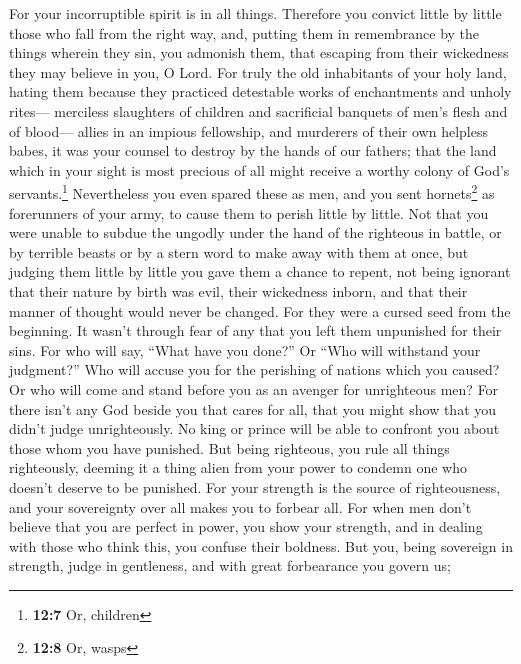  For your incorruptible spirit is in all things.
 Therefore you convict little by little those who fall
from the right way, and, putting them in remembrance by the things
wherein they sin, you admonish them, that escaping from their wickedness
they may believe in you, O Lord.  For truly the old
inhabitants of your holy land,  hating them because they
practiced detestable works of enchantments and unholy rites---
 merciless slaughters of children and sacrificial banquets
of men's flesh and of blood---  allies in an impious
fellowship, and murderers of their own helpless babes, it was your
counsel to destroy by the hands of our fathers;  that the
land which in your sight is most precious of all might receive a worthy
colony of God's servants.\footnote{\textbf{12:7} Or, children}
 Nevertheless you even spared these as men, and you sent
hornets\footnote{\textbf{12:8} Or, wasps} as forerunners of your army,
to cause them to perish little by little.  Not that you
were unable to subdue the ungodly under the hand of the righteous in
battle, or by terrible beasts or by a stern word to make away with them
at once,  but judging them little by little you gave them
a chance to repent, not being ignorant that their nature by birth was
evil, their wickedness inborn, and that their manner of thought would
never be changed.  For they were a cursed seed from the
beginning. It wasn't through fear of any that you left them unpunished
for their sins.  For who will say, ``What have you
done?'' Or ``Who will withstand your judgment?'' Who will accuse you for
the perishing of nations which you caused? Or who will come and stand
before you as an avenger for unrighteous men?  For there
isn't any God beside you that cares for all, that you might show that
you didn't judge unrighteously.  No king or prince will
be able to confront you about those whom you have punished.
 But being righteous, you rule all things righteously,
deeming it a thing alien from your power to condemn one who doesn't
deserve to be punished.  For your strength is the source
of righteousness, and your sovereignty over all makes you to forbear
all.  For when men don't believe that you are perfect in
power, you show your strength, and in dealing with those who think this,
you confuse their boldness.  But you, being sovereign in
strength, judge in gentleness, and with great forbearance you govern us;
